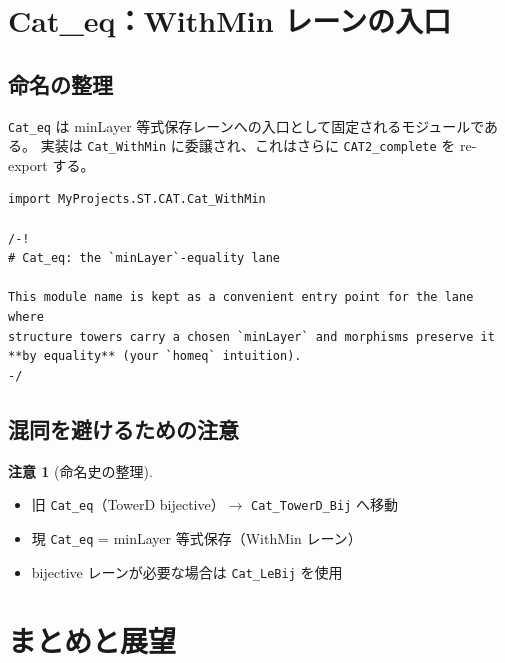 \documentclass{ltjsarticle}
\theoremstyle{definition}
\newtheorem{remark}[definition]{注意}
\begin{document}
\section{Cat\_eq：WithMin レーンの入口}
\label{sec:cat-eq}

\subsection{命名の整理}

\texttt{Cat\_eq} は minLayer 等式保存レーンへの入口として固定されるモジュールである。
実装は \texttt{Cat\_WithMin} に委譲され、これはさらに \texttt{CAT2\_complete} を re-export する。

\begin{leanbox}
\begin{lstlisting}
import MyProjects.ST.CAT.Cat_WithMin

/-!
# Cat_eq: the `minLayer`-equality lane

This module name is kept as a convenient entry point for the lane where 
structure towers carry a chosen `minLayer` and morphisms preserve it 
**by equality** (your `homeq` intuition).
-/
\end{lstlisting}
\end{leanbox}

\subsection{混同を避けるための注意}

\begin{remark}[命名史の整理]
\begin{itemize}
  \item 旧 \texttt{Cat\_eq}（TowerD bijective）$\to$ \texttt{Cat\_TowerD\_Bij} へ移動
  \item 現 \texttt{Cat\_eq} = minLayer 等式保存（WithMin レーン）
  \item bijective レーンが必要な場合は \texttt{Cat\_LeBij} を使用
\end{itemize}
\end{remark}

\section{まとめと展望}
\end{document}
